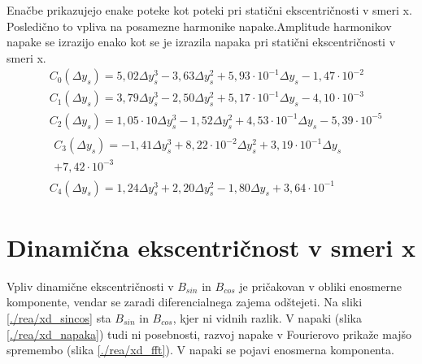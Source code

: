 Enačbe prikazujejo enake poteke kot poteki pri statični ekscentričnosti v smeri x.
Posledično to vpliva na posamezne harmonike napake.Amplitude harmonikov napake se izrazijo enako kot se je izrazila napaka pri statični ekscentričnosti v smeri x.
\begin{eqnarray}
&C_0(\Delta y_s) =5,02\Delta y_s^{3}-3,63\Delta y_s^{2}+5,93\cdot 10^{-1}\Delta y_s-1,47\cdot 10^{-2} \\              
&C_1(\Delta y_s) =3,79\Delta y_s^{3}-2,50\Delta y_s^{2}+5,17\cdot 10^{-1}\Delta y_s-4,10\cdot 10^{-3} \\              
&C_2(\Delta y_s) =1,05\cdot 10\Delta y_s^{3}-1,52\Delta y_s^{2}+4,53\cdot 10^{-1}\Delta y_s-5,39\cdot 10^{-5} \\      
&\begin{split}C_3(\Delta y_s) =-1,41\Delta y_s^{3}+8,22\cdot 10^{-2}\Delta y_s^{2}+3,19\cdot 10^{-1}\Delta y_s\\+7,42\cdot 10^{-3} \end{split}\\
&C_4(\Delta y_s) =1,24\Delta y_s^{3}+2,20\Delta y_s^{2}-1,80\Delta y_s+3,64\cdot 10^{-1}     
\end{eqnarray}
\section{Dinamična ekscentričnost v smeri x}
Vpliv dinamične ekscentričnosti v $B_{sin}$ in $B_{cos}$ je pričakovan v obliki enosmerne komponente, vendar se zaradi diferencialnega zajema odštejeti. Na sliki  \ref{./rea/xd_sincos} sta $B_{sin}$ in $B_{cos}$, kjer ni vidnih razlik. V napaki (slika \ref{./rea/xd_napaka})  tudi ni posebnosti, razvoj napake v Fourierovo prikaže majšo spremembo (slika \ref{./rea/xd_fft}). V napaki se pojavi enosmerna komponenta.
\newpage
